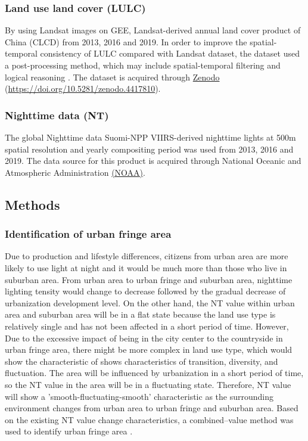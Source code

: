 \subsubsection{Land use land cover (LULC)}
By using Landsat images on GEE, Landsat-derived annual land cover product of China (CLCD) from 2013, 2016 and 2019. In order to improve the spatial-temporal consistency of LULC compared with Landsat dataset, the dataset used a post-processing method, which may include spatial-temporal filtering and logical reasoning \parencite{yang_30_2021}. The dataset is acquired through \href{https://doi.org/10.5281/zenodo.4417810}{Zenodo} (\url{https://doi.org/10.5281/zenodo.4417810}).\\

\subsubsection{Nighttime data (NT)}
The global Nighttime data Suomi-NPP VIIRS-derived nighttime lights at 500m spatial resolution and yearly compositing period was used from 2013, 2016 and 2019. The data source for this product is acquired through National Oceanic and Atmospheric Administration \href{https://github.com/Jackeytanlor/CASA_Dissertation/tree/main/dataset/NT}{(NOAA)}.\\

\subsection{Methods}
\subsubsection{Identification of urban fringe area}
Due to production and lifestyle differences, citizens from urban area are more likely to use light at night and it would be much more than those who live in suburban area. From urban area to urban fringe and suburban area, nighttime lighting tensity would change to decrease followed by the gradual decrease of urbanization development level. On the other hand, the NT value within urban area and suburban area will be in a flat state because the land use type is relatively single and has not been affected in a short period of time. However, Due to the excessive impact of being in the city center to the countryside in urban fringe area, there might be more complex in land use type, which would show the characteristic of shows characteristics of transition, diversity, and fluctuation. The area will be influenced by urbanization in a short period of time, so the NT value in the area will be in a fluctuating state. Therefore, NT value will show a 'smooth-fluctuating-smooth' characteristic as the surrounding environment changes from urban area to urban fringe and suburban area. Based on the existing NT value change characteristics, a combined–value method was used to identify urban fringe area \parencite{yang_spatial_2017}.\\

